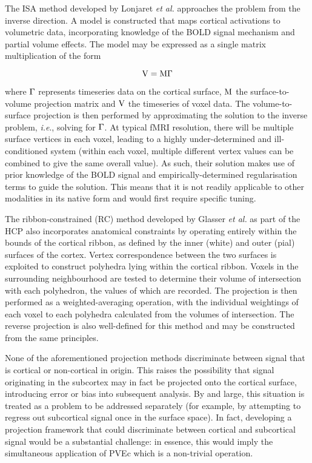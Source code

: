 The ISA method developed by Lonjaret \textit{et al.} \cite{Lonjaret2017} approaches the problem from the inverse direction. A model is constructed that maps cortical activations to volumetric data, incorporating knowledge of the BOLD signal mechanism and partial volume effects. The model may be expressed as a single matrix multiplication of the form 

\begin{equation}
\mathrm{V = M \Gamma}
\end{equation}

where $\mathrm{\Gamma}$ represents timeseries data on the cortical surface, $\mathrm{M}$ the surface-to-volume projection matrix and $\mathrm{V}$ the timeseries of voxel data. The volume-to-surface projection is then performed by approximating the solution to the inverse problem, \textit{i.e}., solving for $\mathrm{\Gamma}$. At typical fMRI resolution, there will be multiple surface vertices in each voxel, leading to a highly under-determined and ill-conditioned system (within each voxel, multiple different vertex values can be combined to give the same overall value). As such, their solution makes use of prior knowledge of the BOLD signal and empirically-determined regularisation terms to guide the solution. This means that it is not readily applicable to other modalities in its native form and would first require specific tuning. 

The ribbon-constrained (RC) method developed by Glasser \textit{et al.} \cite{Glasser2013} as part of the HCP also incorporates anatomical constraints by operating entirely within the bounds of the cortical ribbon, as defined by the inner (white) and outer (pial) surfaces of the cortex. Vertex correspondence between the two surfaces is exploited to construct polyhedra lying within the cortical ribbon. Voxels in the surrounding neighbourhood are tested to determine their volume of intersection with each polyhedron, the values of which are recorded. The projection is then performed as a weighted-averaging operation, with the individual weightings of each voxel to each polyhedra calculated from the volumes of intersection. The reverse projection is also well-defined for this method and may be constructed from the same principles.

None of the aforementioned projection methods discriminate between signal that is cortical or non-cortical in origin. This raises the possibility that signal originating in the subcortex may in fact be projected onto the cortical surface, introducing error or bias into subsequent analysis. By and large, this situation is treated as a problem to be addressed separately (for example, by attempting to regress out subcortical signal once in the surface space). In fact, developing a projection framework that could discriminate between cortical and subcortical signal would be a substantial challenge: in essence, this would imply the simultaneous application of PVEc which is a non-trivial operation. 

